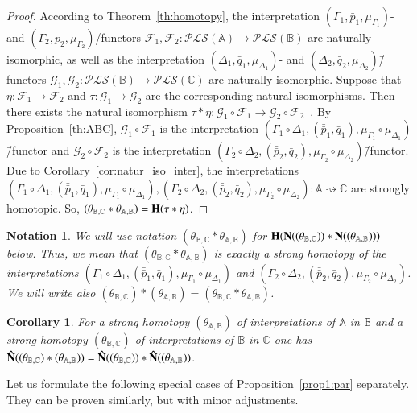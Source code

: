 \documentclass[12pt]{article}
\newtheorem{corollary}{Corollary}
\newtheorem{notation}{Notation}
\theoremstyle{definition}
\def\MA{{\mathbb{A}}}
\def\MB{{\mathbb{B}}}
\def\MC{{\mathbb{C}}}
\def\F{{\mathcal{F}}}
\def\G{{\mathcal{G}}}
\def\PLS{{\mathcal{PLS}}}
\begin{document}
\begin{proof}
According to Theorem~\ref{th:homotopy}, the interpretation $(\Gamma_1,\bar p_1,\mu_{\Gamma_1})$- and $(\Gamma_2,\bar p_2,\mu_{\Gamma_2})$\=/functors $\F_1,\F_2\colon\PLS(\MA)\to\PLS(\MB)$ are naturally isomorphic, as well as the interpretation $(\Delta_1,\bar q_1,\mu_{\Delta_1})$- and $(\Delta_2,\bar q_2,\mu_{\Delta_2})$\=/functors $\G_1,\G_2\colon\PLS(\MB)\to\PLS(\MC)$ are naturally isomorphic. Suppose that $\eta\colon \F_1\to\F_2$ and $\tau\colon\G_1\to\G_2$ are the corresponding natural isomorphisms. Then there exists the natural isomorphism $\tau\ast\eta\colon\G_1\circ\F_1\to\G_2\circ\F_2$~\cite{MacLane}. By Proposition~\ref{th:ABC}, $\G_1\circ\F_1$ is the interpretation $(\Gamma_1\circ\Delta_1,(\bar{\bar p}_1,\bar q_1),\mu_{\Gamma_1}\circ\mu_{\Delta_1})$\=/functor and $\G_2\circ\F_2$ is the interpretation $(\Gamma_2\circ\Delta_2,(\bar{\bar p}_2,\bar q_2),\mu_{\Gamma_2}\circ\mu_{\Delta_2})$\=/functor. Due to Corollary~\ref{cor:natur_iso_inter}, the interpretations $(\Gamma_1\circ\Delta_1,(\bar{\bar p}_1,\bar q_1),\mu_{\Gamma_1}\circ\mu_{\Delta_1}),(\Gamma_2\circ\Delta_2,(\bar{\bar p}_2,\bar q_2),\mu_{\Gamma_2}\circ\mu_{\Delta_2})\colon \MA\rightsquigarrow\MC$ are strongly homotopic. So, $(\theta_{\MB,\MC}\ast\theta_{\MA,\MB})={\bf H}(\tau\ast\eta)$.
\end{proof}

\begin{notation}
We will use notation $(\theta_{\MB,\MC}\ast\theta_{\MA,\MB})$ for ${\bf H}({\bf N}((\theta_{\MB,\MC}))\ast{\bf N}((\theta_{\MA,\MB})))$ below. Thus, we mean that $(\theta_{\MB,\MC}\ast\theta_{\MA,\MB})$ is exactly a strong homotopy of the interpretations $(\Gamma_1\circ\Delta_1,(\bar{\bar p}_1,\bar q_1),\mu_{\Gamma_1}\circ\mu_{\Delta_1})$ and $(\Gamma_2\circ\Delta_2,(\bar{\bar p}_2,\bar q_2),\mu_{\Gamma_2}\circ\mu_{\Delta_2})$. We will write also $(\theta_{\MB,\MC})\ast(\theta_{\MA,\MB})=(\theta_{\MB,\MC}\ast\theta_{\MA,\MB})$.
\end{notation}

\begin{corollary}\label{cor:ast_N}
For a strong homotopy $(\theta_{\MA,\MB})$ of interpretations of $\MA$ in $\MB$ and a strong homotopy $(\theta_{\MB,\MC})$ of interpretations of $\MB$ in $\MC$ one has ${\bf \hat N}((\theta_{\MB,\MC})\ast(\theta_{\MA,\MB}))={\bf \hat N}((\theta_{\MB,\MC}))\ast{\bf \hat N}((\theta_{\MA,\MB}))$.
\end{corollary}

Let us formulate the following special cases of Proposition~\ref{prop1:par} separately. They can be proven similarly, but with minor adjustments.
\end{document}
